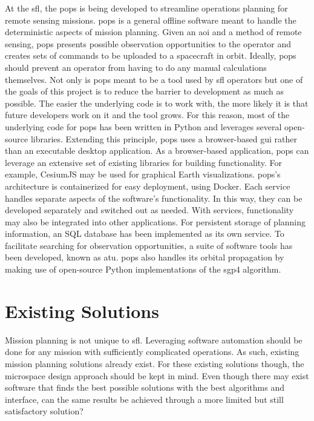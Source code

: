 At the \gls{sfl}, the \gls{pops} is being developed to streamline operations
planning for remote sensing missions. \gls{pops} is a general offline software
meant to handle the deterministic aspects of mission planning.  Given an
\gls{aoi} and a method of remote sensing, \gls{pops} presents possible
observation opportunities to the operator and creates sets of commands to be
uploaded to a spacecraft in orbit.  Ideally, \gls{pops} should prevent an
operator from having to do any manual calculations themselves. Not only is
\gls{pops} meant to be a tool used by \gls{sfl} operators but one of the goals
of this project is to reduce the barrier to development as much as possible.
The easier the underlying code is to work with, the more likely it is that
future developers work on it and the tool grows. For this reason, most of the
underlying code for \gls{pops} has been written in Python and leverages several
open-source libraries.  Extending this principle, \gls{pops} uses a
browser-based \gls{gui} rather than an executable desktop application. As a
browser-based application, \gls{pops} can leverage an extensive set of existing
libraries for building functionality.  For example, CesiumJS may be used for
graphical Earth visualizations.  \gls{pops}’s architecture is containerized for
easy deployment, using Docker.  Each service handles separate aspects of the
software’s functionality.  In this way, they can be developed separately and
switched out as needed. With services, functionality may also be integrated
into other applications. For persistent storage of planning information, an SQL
database has been implemented as its own service.  To facilitate searching for
observation opportunities, a suite of software tools has been developed, known
as \gls{atu}.  \gls{pops} also handles its orbital propagation by making
use of open-source Python implementations of the \gls{sgp4} algorithm. 


\section{Existing Solutions}\label{sec:exsoln}

Mission planning is not unique to \gls{sfl}. Leveraging software automation
should be done for any mission with sufficiently complicated operations.  As
such, existing mission planning solutions already exist. For these existing
solutions though, the microspace design approach should be kept in mind. Even
though there may exist software that finds the best possible solutions with the
best algorithms and interface, can the same results be achieved through a more
limited but still satisfactory solution? 


